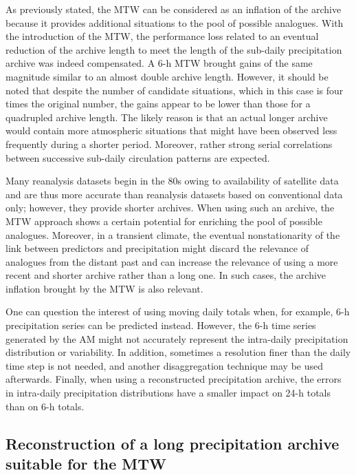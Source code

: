\documentclass[hess, manuscript]{copernicus}
\begin{document}
	As previously stated, the MTW can be considered as an inflation of the archive because it provides additional situations to the pool of possible analogues. With the introduction of the MTW, the performance loss related to an eventual reduction of the archive length to meet the length of the sub-daily precipitation archive was indeed compensated. A 6-h MTW brought gains of the same magnitude similar to an almost double archive length. However, it should be noted that despite the number of candidate situations, which in this case is four times the original number, the gains appear to be lower than those for a quadrupled archive length. The likely reason is that an actual longer archive would contain more atmospheric situations that might have been observed less frequently during a shorter period. Moreover, rather strong serial correlations between successive sub-daily circulation patterns are expected.
	
	Many reanalysis datasets begin in the 80s owing to availability of satellite data and are thus more accurate than reanalysis datasets based on conventional data only; however, they provide shorter archives. When using such an archive, the MTW approach shows a certain potential for enriching the pool of possible analogues. Moreover, in a transient climate, the eventual nonstationarity of the link between predictors and precipitation might discard the relevance of analogues from the distant past and can increase the relevance of using a more recent and shorter archive rather than a long one. In such cases, the archive inflation brought by the MTW is also relevant.
	
	One can question the interest of using moving daily totals when, for example, 6-h precipitation series can be predicted instead. However, the 6-h time series generated by the AM might not accurately represent the intra-daily precipitation distribution or variability. In addition, sometimes a resolution finer than the daily time step is not needed, and another disaggregation technique may be used afterwards. Finally, when using a reconstructed precipitation archive, the errors in intra-daily precipitation distributions have a smaller impact on 24-h totals than on 6-h totals.
	
	
	\subsection{Reconstruction of a long precipitation archive suitable for the MTW}
	\label{sec:reconstruction}
	
\end{document}
